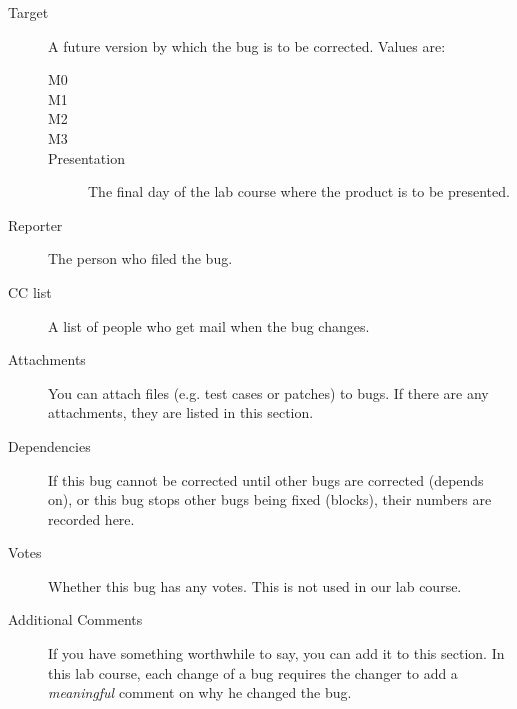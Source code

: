 \documentclass[11pt,nologo,handout]{handout}
\begin{document}
\begin{description}
\item[Target]  A future version by which the bug is to be corrected.
  Values are:
  \begin{description}
  \item[M0]
  \item[M1]
  \item[M2]
  \item[M3]
  \item[Presentation]  The final day of the lab course where the product
    is to be presented.
  \end{description}
\item[Reporter]  The person who filed the bug.
\item[CC list]  A list of people who get mail when the bug changes.
\item[Attachments]  You can attach files (e.g. test cases or patches) to
  bugs.  If there are any attachments, they are listed in this section.
\item[Dependencies]  If this bug cannot be corrected until other bugs are
  corrected (depends on), or this bug stops other bugs being fixed (blocks),
  their numbers are recorded here.
\item[Votes]  Whether this bug has any votes.  This is not used in our
  lab course.
\item[Additional Comments]  If you have something worthwhile to say, you
  can add it to this section.  In this lab course, each change of a bug
  requires the changer to add a \emph{meaningful} comment on why he
  changed the bug.
\end{description}
\end{document}
